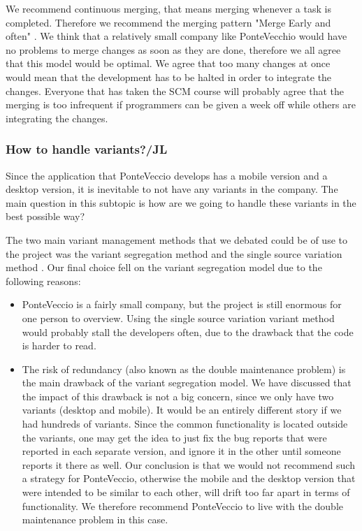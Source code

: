 \documentclass[10pt]{article}
\begin{document}
\noindent We recommend continuous merging, that means merging whenever a task is completed. Therefore we recommend the merging pattern "Merge Early and often" \cite{Appleton}. We think that a relatively small company like PonteVecchio would have no problems to merge changes as soon as they are done, therefore we all agree that this model would be optimal. We agree that too many changes at once would mean that the development has to be halted in order to integrate the changes. Everyone that has taken the SCM course will probably agree that the merging is too infrequent if programmers can be given a week off while others are integrating the changes.

\subsubsection{How to handle variants?/JL}
Since the application that PonteVeccio develops has a mobile version and a desktop version, it is inevitable to not have any variants in the company. The main question in this subtopic is how are we going to handle these variants in the best possible way?

\noindent The two main variant management methods that we debated could be of use to the project was the variant segregation method and the single source variation method \cite{Mahler}. Our final choice fell on the variant segregation model due to the following reasons:
\begin{itemize}
\item PonteVeccio is a fairly small company, but the project is still enormous for one person to overview. Using the single source variation variant method would probably stall the developers often, due to the drawback that the code is harder to read.
\item The risk of redundancy (also known as the double maintenance problem\cite{Babich}) is the main drawback of the variant segregation model. We have discussed that the impact of this drawback is not a big concern, since we only have two variants (desktop and mobile). It would be an entirely different story if we had hundreds of variants. Since the common functionality is located outside the variants, one may get the idea to just fix the bug reports that were reported in each separate version, and ignore it in the other until someone reports it there as well. Our conclusion is that we would not recommend such a strategy for PonteVeccio, otherwise the mobile and the desktop version that were intended to be similar to each other, will drift too far apart in terms of functionality. We therefore recommend PonteVeccio to live with the double maintenance problem in this case.

\end{itemize}
\noindent
\end{document}
